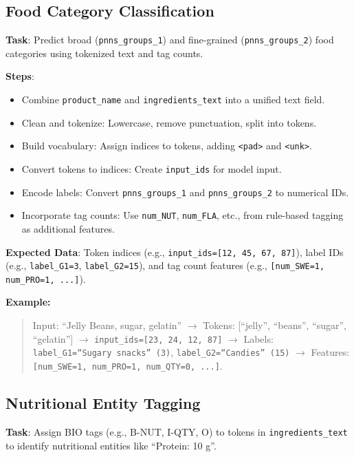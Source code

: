 \documentclass[11pt]{article}
\begin{document}
\subsection{Food Category Classification}

\textbf{Task}: Predict broad (\texttt{pnns\_groups\_1}) and fine-grained (\texttt{pnns\_groups\_2}) food categories using tokenized text and tag counts.

\textbf{Steps}:
\begin{itemize}[noitemsep]
    \item Combine \texttt{product\_name} and \texttt{ingredients\_text} into a unified text field.
    \item Clean and tokenize: Lowercase, remove punctuation, split into tokens.
    \item Build vocabulary: Assign indices to tokens, adding \texttt{<pad>} and \texttt{<unk>}.
    \item Convert tokens to indices: Create \texttt{input\_ids} for model input.
    \item Encode labels: Convert \texttt{pnns\_groups\_1} and \texttt{pnns\_groups\_2} to numerical IDs.
    \item Incorporate tag counts: Use \texttt{num\_NUT}, \texttt{num\_FLA}, etc., from rule-based tagging as additional features.
\end{itemize}

\textbf{Expected Data}: Token indices (e.g., \texttt{input\_ids=[12, 45, 67, 87]}), label IDs (e.g., \texttt{label\_G1=3}, \texttt{label\_G2=15}), and tag count features (e.g., \texttt{[num\_SWE=1, num\_PRO=1, ...]}).

\textbf{Example:}
\begin{quote}
Input: ``Jelly Beans, sugar, gelatin'' $\to$ Tokens: [``jelly'', ``beans'', ``sugar'', ``gelatin''] $\to$ \texttt{input\_ids=[23, 24, 12, 87]} $\to$ Labels: \texttt{label\_G1=``Sugary snacks'' (3)}, \texttt{label\_G2=``Candies'' (15)} $\to$ Features: \texttt{[num\_SWE=1, num\_PRO=1, num\_QTY=0, ...]}.
\end{quote}

\subsection{Nutritional Entity Tagging}

\textbf{Task}: Assign BIO tags (e.g., B-NUT, I-QTY, O) to tokens in \texttt{ingredients\_text} to identify nutritional entities like ``Protein: 10 g''.
\end{document}
